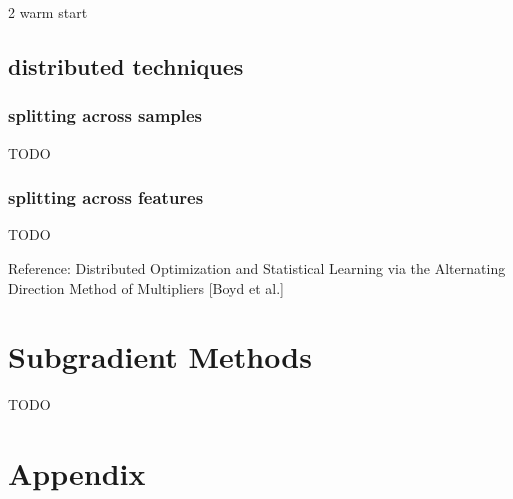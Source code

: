 \documentclass[8pt]{extarticle}
\begin{document}
\begin{multicols*}{2}
  warm start

  \subsection{distributed techniques}

  \subsubsection{splitting across samples}
  TODO

  \subsubsection{splitting across features}
  TODO
  
  Reference: Distributed Optimization and Statistical Learning via the Alternating Direction Method of Multipliers [Boyd et al.]
  
  \vfill\null
  
  \pagebreak

  \section{Subgradient Methods}

  TODO

  \vfill\null
  \pagebreak
  
  \section{Appendix}


\end{multicols*}
\end{document}
